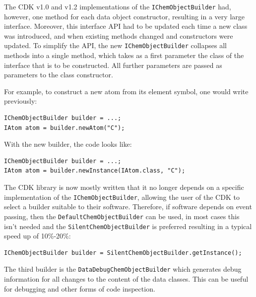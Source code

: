 \documentclass[10pt]{bmcart}
\begin{document}
The CDK v1.0 and v1.2 implementations of the \texttt{IChemObjectBuilder} had,
however, one method for each data object constructor, resulting in a very large
interface. Moreover, this interface API had to be updated each time a new class
was introduced, and when existing methods changed and constructors were updated.
To simplify the API, the new \texttt{IChemObjectBuilder} collapses all methods
into a single method, which takes as a first parameter the class of the
interface that is to be constructed. All further parameters are passed as
parameters to the class constructor.

For example, to construct a new atom from its element symbol, one
would write previously:

\vspace{0.2cm}
\begin{verbatim}
IChemObjectBuilder builder = ...;
IAtom atom = builder.newAtom("C");
\end{verbatim}
\vspace{0.2cm}

With the new builder, the code looks like:

\vspace{0.2cm}
\begin{verbatim}
IChemObjectBuilder builder = ...;
IAtom atom = builder.newInstance(IAtom.class, "C");
\end{verbatim}
\vspace{0.2cm}

The CDK library is now mostly written that it no longer depends on a specific
implementation of the \texttt{IChemObjectBuilder}, allowing the user of the
CDK to select a builder suitable to their software. Therefore, if software
depends on event passing, then the \texttt{DefaultChemObjectBuilder} can be
used, in most cases this isn't needed and the \texttt{SilentChemObjectBuilder} 
is preferred resulting in a typical speed up of 10\%-20\%:

\vspace{0.2cm}
\begin{verbatim}
IChemObjectBuilder builder = SilentChemObjectBuilder.getInstance();
\end{verbatim}
\vspace{0.2cm}

The third builder is the \texttt{DataDebugChemObjectBuilder} which generates debug
information for all changes to the content of the data classes. This
can be useful for debugging and other forms of code inspection.
\end{document}
